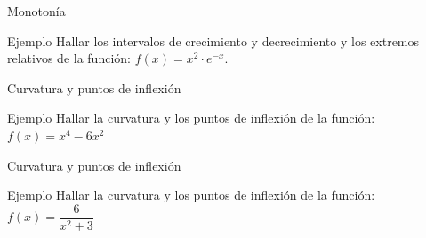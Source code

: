 \documentclass[8pt]{beamer}
\begin{document}
\begin{frame}[t]{Monotonía}
\begin{exampleblock}{Ejemplo}
Hallar los intervalos de crecimiento y decrecimiento y los extremos relativos de la función: $f(x)=x^2 \cdot e^{-x}$.
\end{exampleblock}
\end{frame}


\begin{frame}[t]{Curvatura y puntos de inflexión}
\begin{exampleblock}{Ejemplo}
Hallar la curvatura y los puntos de inflexión de la función: $f(x)=x^4-6x^2$
\end{exampleblock}
\end{frame}

\begin{frame}[t]{Curvatura y puntos de inflexión}
\begin{exampleblock}{Ejemplo}
Hallar la curvatura y los puntos de inflexión de la función: $f(x)=\dfrac{6}{x^2+3}$
\end{exampleblock}
\end{frame}
\end{document}
